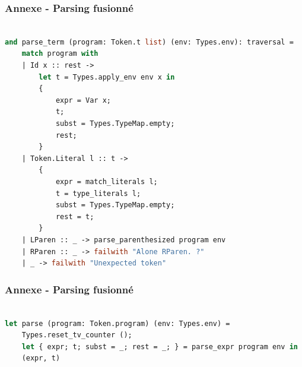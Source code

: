 \documentclass{beamer}
\begin{document}
\begin{frame}[fragile]
		\frametitle{Annexe - Parsing fusionné}
		\begin{lstlisting}[language=ML]
			
and parse_term (program: Token.t list) (env: Types.env): traversal =
    match program with
    | Id x :: rest -> 
        let t = Types.apply_env env x in 
        { 
            expr = Var x; 
            t;
            subst = Types.TypeMap.empty; 
            rest;
        }
    | Token.Literal l :: t -> 
        {
            expr = match_literals l;
            t = type_literals l;
            subst = Types.TypeMap.empty;
            rest = t;
        }  
    | LParen :: _ -> parse_parenthesized program env
    | RParen :: _ -> failwith "Alone RParen. ?"
    | _ -> failwith "Unexpected token"
		\end{lstlisting}
	
\end{frame}
\begin{frame}[fragile]
		\frametitle{Annexe - Parsing fusionné}
		\begin{lstlisting}[language=ML]
			
let parse (program: Token.program) (env: Types.env) =
    Types.reset_tv_counter ();
    let { expr; t; subst = _; rest = _; } = parse_expr program env in
    (expr, t)
		\end{lstlisting}
	
\end{frame}
\end{document}
